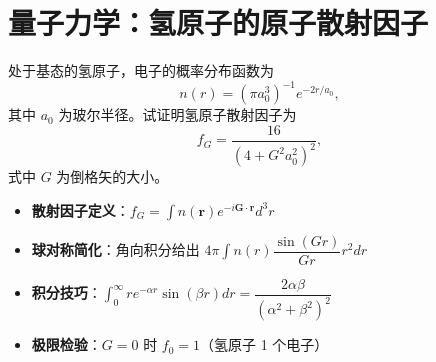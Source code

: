 \section{量子力学：氢原子的原子散射因子}
\label{sec:hydrogen-scattering-factor}

\begin{modelbox}[题目：氢原子基态的X射线散射因子]
处于基态的氢原子，电子的概率分布函数为
\begin{equation}
n(r)=(\pi a_0^3)^{-1}e^{-2r/a_0},
\end{equation}
其中 $a_0$ 为玻尔半径。试证明氢原子散射因子为
\begin{equation}
f_G=\frac{16}{(4+G^2a_0^2)^2},
\end{equation}
式中 $G$ 为倒格矢的大小。
\end{modelbox}

\begin{tipbox}[考点快速分析]
\begin{itemize}
    \item \textbf{散射因子定义}：$f_G=\int n(\bm{r})e^{-i\bm{G}\cdot\bm{r}}d^3r$
    \item \textbf{球对称简化}：角向积分给出 $4\pi\int n(r)\dfrac{\sin(Gr)}{Gr}r^2dr$
    \item \textbf{积分技巧}：$\int_0^\infty re^{-\alpha r}\sin(\beta r)dr=\dfrac{2\alpha\beta}{(\alpha^2+\beta^2)^2}$
    \item \textbf{极限检验}：$G=0$ 时 $f_0=1$（氢原子 1 个电子）
\end{itemize}
\end{tipbox}

